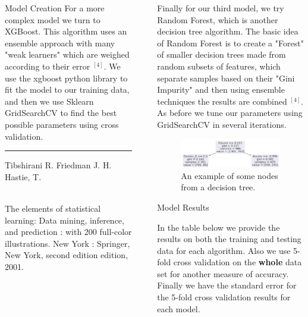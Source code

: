 \documentclass[6pt, final, xcolor=table]{beamer}
\newlength{\sepwidth}
\newlength{\colwidth}
\newcommand{\separatorcolumn}{\begin{column}{\sepwidth}\end{column}}
\begin{document}
\begin{frame}[t]
\begin{columns}[t]
\begin{column}{\colwidth}
\begin{block}{Model Creation}
    For a more complex model we turn to XGBoost.
    This algorithm uses an ensemble approach with many "weak learners" which are weighed according to their
    error $^{[4]}$. We use the xgboost python library to fit the model to our training data,
    and then we use Sklearn GridSearchCV to find the best possible parameters using
    cross validation.  

\end{block}

\hrule
\begin{description}
    \small{\item [{[4]}] Tibshirani R. Friedman J. H. Hastie, T.} \\
    \footnotesize{The elements of statistical learning: Data mining, inference, and prediction : with 200 full-color illustrations. New York : Springer, New York, second edition edition, 2001.} 
\end{description}

\end{column}

\separatorcolumn

\begin{column}{\colwidth}

    Finally for our third model, we try Random Forest, which is another decision tree
    algorithm. The basic idea of Random Forest is to create a "Forest" of smaller decision trees made from random subsets of features, which separate samples based on their "Gini Impurity" and then using ensemble techniques the results are combined $^{[4]}$. As before we tune our parameters using GridSearchCV in several iterations.
  \begin{figure}[h!]
    \centering
     \includegraphics[scale=1.3]{smaller_rf_tree.png}
    \caption{An example of some nodes from a decision tree.}
    \label{fig:method}
    \end{figure}  


  \begin{block}{Model Results}

    In the table below we provide the results on both the training and testing data for each
    algorithm. Also we use 5-fold cross validation on the \textbf{whole} data set for another
    measure of accuracy. Finally we have the standard error for the 5-fold cross validation
    results for each model.


\end{block}
\end{column}
\end{columns}
\end{frame}
\end{document}
